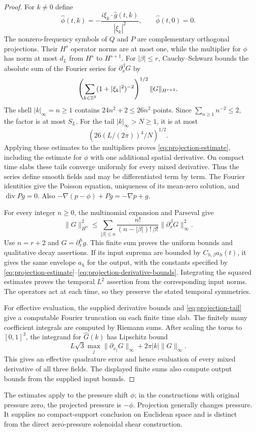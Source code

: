 \begin{proof}
For $k\ne0$ define
\[
 \widehat\phi(t,k)=-\frac{i\xi_k\cdot\widehat g(t,k)}{|\xi_k|^2},
 \qquad \widehat\phi(t,0)=0.
\]
The nonzero-frequency symbols of $Q$ and $P$ are complementary orthogonal
projections. Their $H^s$ operator norms are at most one, while the
multiplier for $\phi$ has norm at most $d_L$ from $H^s$ to $H^{s+1}$.
For $|\beta|\le r$, Cauchy--Schwarz bounds the absolute sum of the
Fourier series for $\partial_x^\beta G$ by
\[
 \left(\sum_{k\in\mathbb Z^3}(1+|\xi_k|^2)^{-2}\right)^{1/2}
 \|G\|_{H^{r+2}}.
\]
The shell $|k|_\infty=n\ge1$ contains $24n^2+2\le26n^2$ points.
Since $\sum_{n\ge1}n^{-2}\le2$, the factor is at most $S_L$.
For the tail $|k|_\infty>N\ge1$, it is at most
\begin{equation}\label{eq:projection-tail}
 \left(26(L/(2\pi))^4/N\right)^{1/2}.
\end{equation}
Applying these estimates to the multipliers proves
\eqref{eq:projection-estimate}, including the estimate for $\phi$ with
one additional spatial derivative. On compact time slabs these tails
converge uniformly for every mixed derivative. Thus the series define
smooth fields and may be differentiated term by term. The Fourier
identities give the Poisson equation, uniqueness of its mean-zero
solution, and $\operatorname{div}Pg=0$. Also
$-\nabla(p-\phi)+Pg=-\nabla p+g$.

For every integer $n\ge0$, the multinomial expansion and Parseval give
\begin{equation}\label{eq:projection-derivative-bounds}
 \|G\|_{H^n}^2
 \le\sum_{|\beta|\le n}
       \frac{n!}{(n-|\beta|)!\,\beta!}
       \|\partial_x^\beta G\|_\infty^2.
\end{equation}
Use $n=r+2$ and $G=\partial_t^h g$. This finite sum proves the uniform
bounds and qualitative decay assertions. If its input suprema are
bounded by $C_{h,\beta}a_h(t)$, it gives the same envelope $a_h$ for
the output, with the constants specified by
\eqref{eq:projection-estimate}--\eqref{eq:projection-derivative-bounds}.
Integrating the squared estimates proves the temporal $L^2$ assertion
from the corresponding input norms. The operators act at each time,
so they preserve the stated temporal symmetries.

For effective evaluation, the supplied derivative bounds and
\eqref{eq:projection-tail} give a computable Fourier truncation on each
finite time slab. The finitely many coefficient integrals are computed
by Riemann sums. After scaling the torus to $[0,1]^3$, the integrand
for $\widehat G(k)$ has Lipschitz bound
\[
 L\sqrt3\max_j\|\partial_{x_j}G\|_\infty
       +2\pi|k|\|G\|_\infty.
\]
This gives an effective quadrature error and hence evaluation of every
mixed derivative of all three fields. The displayed finite sums also
compute output bounds from the supplied input bounds.
\end{proof}
The estimates apply to the pressure shift $\phi$; in the constructions
with original pressure zero, the projected pressure is $-\phi$.
Projection generally changes pressure. It supplies no compact-support
conclusion on Euclidean space and is distinct from the direct zero-pressure
solenoidal shear construction.

